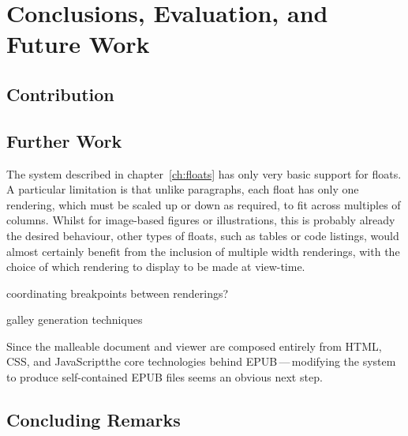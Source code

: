 \chapter{Conclusions, Evaluation, and Future Work}\label{ch:conclusions}

\section{Contribution}

\section{Further Work}

The system described in chapter~\ref{ch:floats} has only very basic support for floats. A particular limitation is that unlike paragraphs, each float has only one rendering, which must be scaled up or down as required, to fit across multiples of columns. Whilst for image-based figures or illustrations, this is probably already the desired behaviour, other types of floats, such as tables or code listings, would almost certainly benefit from the inclusion of multiple width renderings, with the choice of which rendering to display to be made at view-time. %

coordinating breakpoints between renderings?

galley generation techniques


Since the malleable document and viewer are composed entirely from HTML, CSS, and JavaScript\ed the core technologies behind EPUB\,---\,modifying the system to produce self-contained EPUB files seems an obvious next step.

\section{Concluding Remarks}
